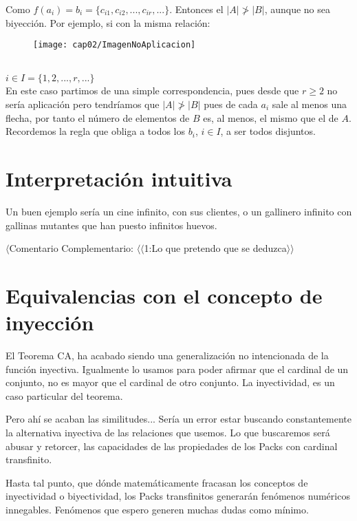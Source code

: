 Como $f(a_{i}) = b_{i} = \{c_{i1}, c_{i2}, ... , c_{ir}, ... \}$. Entonces el $|A| \ngtr |B|$, aunque no sea biyección.
\newpage
Por ejemplo, si con la misma relación:
\begin{figure}[h!]
	\texttt{[image: cap02/ImagenNoAplicacion]}
	\centering
\end{figure}\\
\noindent
$i \in I=\{ 1, 2, ..., r, ...\}$\\

En este caso partimos de una simple correspondencia, pues desde que $r\geq 2$ no sería aplicación pero tendríamos que $|A| \ngtr |B|$ pues de cada $a_{i}$ sale al menos una flecha, por tanto el número de elementos de $B$ es, al menos, el mismo que el de $A$. Recordemos la regla que obliga a todos los $b_{i}$, $i \in I$, a ser todos disjuntos.











\newpage
\section{Interpretación intuitiva}
Un buen ejemplo sería un cine infinito, con sus clientes, o un gallinero infinito con gallinas mutantes que han puesto infinitos huevos.

$\langle$Comentario Complementario: $\langle\langle$1:Lo que pretendo que se deduzca$\rangle\rangle$

\newpage
\section{Equivalencias con el concepto de inyección}

El Teorema CA, ha acabado siendo una generalización no intencionada de la función inyectiva. Igualmente lo usamos para poder afirmar que el cardinal de un conjunto, no es mayor que el cardinal de otro conjunto. La inyectividad, es un caso particular del teorema.

Pero ahí se acaban las similitudes... Sería un error estar buscando constantemente la alternativa inyectiva de las relaciones que usemos. Lo que buscaremos será abusar y retorcer, las capacidades de las propiedades de los Packs con cardinal transfinito.

Hasta tal punto, que dónde matemáticamente fracasan los conceptos de inyectividad o biyectividad, los Packs transfinitos generarán fenómenos numéricos innegables. Fenómenos que espero generen muchas dudas como mínimo.